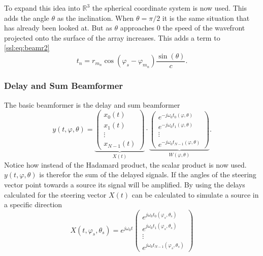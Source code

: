To expand this idea into $\mathbb{R}^3$ the spherical coordinate system is now used.
This adds the angle $\theta$ as the inclination.
When $\theta = \pi/2$ it is the same situation that has already been looked at.
But as $\theta$ approaches 0 the speed of the wavefront projected onto the
surface of the array increases. 
This adds a term to \eqref{ssl:eq:beamr2}
\begin{equation}
	t_n = 
	r_{m_n} \cos(\varphi_s - \varphi_{m_n})
	\frac{\sin(\theta)}{c}.
  \label{ssl:eq:beamr3}
\end{equation}

\subsubsection{Delay and Sum Beamformer}
The basic beamformer is the delay and sum beamformer
\begin{equation}
	\label{ssl:eq:delAndSum}
	y(t, \varphi, \theta) = 
	  \underbrace{
		\begin{pmatrix} 
		  x_0(t) \\ 
		  x_1(t) \\
		  \vdots \\ 
		  x_{N-1}(t)
	  \end{pmatrix}}_{X(t)}
	  \cdot
	  \underbrace{
		\begin{pmatrix} 
			e^{-j\omega_0 t_0(\varphi, \theta)} \\ 
			e^{-j\omega_0 t_1(\varphi, \theta)} \\
			\vdots \\ 
			e^{-j\omega_0 t_{N-1}(\varphi, \theta)} 
		\end{pmatrix}}_{W(\varphi, \theta)}.
\end{equation}
Notice how instead of the Hadamard product, the scalar product is now used.
$y(t, \varphi, \theta)$ is therefor the sum of the delayed signals.
If the angles of the steering vector point towards a source its 
signal will be amplified.
By using the delays calculated for the steering vector $X(t)$ can
be calculated to simulate a source in a specific direction
\begin{equation}
	X(t, \varphi_s, \theta_s) = 
	e^{j\omega_0 t}
	\begin{pmatrix} 
		e^{j\omega_0 t_0(\varphi_s, \theta_s)} \\ 
		e^{j\omega_0 t_1(\varphi_s, \theta_s)} \\
		\vdots \\ 
		e^{j\omega_0 t_{N-1}(\varphi_s, \theta_s)} 
	\end{pmatrix}
\end{equation}
